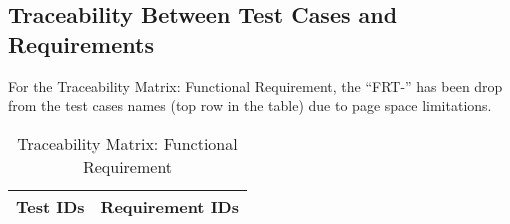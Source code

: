 \documentclass[12pt, titlepage]{article}
\begin{document}
\newpage
\begin{landscape}
\subsection{Traceability Between Test Cases and Requirements}
\noindent For the Traceability Matrix: Functional Requirement, the ``FRT-'' has been drop from the test cases names (top row in the table) due to page space limitations.
\begin{table}[H]
    \centering
    \caption{Traceability Matrix: Functional Requirement}
    \begin{tabular}{l|ccccccccccc}
        \textbf{Test IDs} & \multicolumn{11}{c}{\textbf{Requirement IDs}}\\
        \hline
        

\end{tabular}
\end{table}
\end{landscape}
\end{document}
